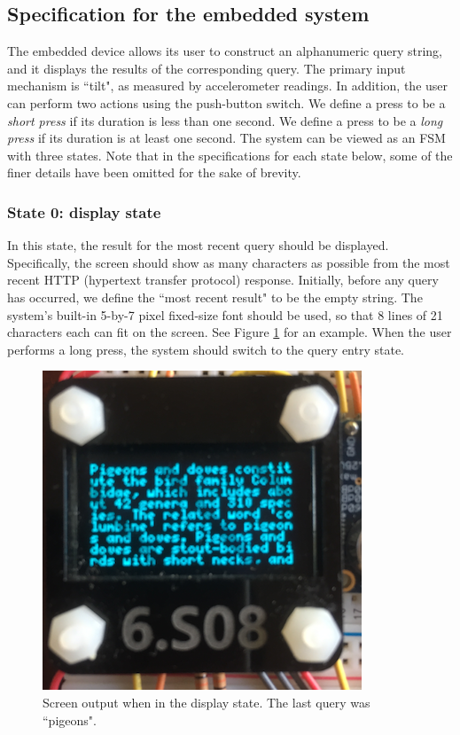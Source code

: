 \documentclass[12pt]{article}
\begin{document}
\subsection{Specification for the embedded system}
The embedded device allows its user to construct an alphanumeric query string, and it displays the results of the corresponding query.  The primary input mechanism is ``tilt", as measured by accelerometer readings.  In addition, the user can perform two actions using the push-button switch.  We define a press to be a \textit{short press} if its duration is less than one second.  We define a press to be a \textit{long press} if its duration is at least one second.  The system can be viewed as an FSM with three states.  Note that in the specifications for each state below, some of the finer details have been omitted for the sake of brevity.

\subsubsection{State 0: display state}
In this state, the result for the most recent query should be displayed.  Specifically, the screen should show as many characters as possible from the most recent HTTP (hypertext transfer protocol) response.  Initially, before any query has occurred, we define the ``most recent result" to be the empty string.  The system's built-in 5-by-7 pixel fixed-size font should be used, so that 8 lines of 21 characters each can fit on the screen.  See Figure \ref{fig:pigeons} for an example.  When the user performs a long press, the system should switch to the query entry state.

\begin{figure}[t]
\centering
\includegraphics[width=0.5\linewidth]{text-wiki-close.png}
\vspace{5mm}
\caption{Screen output when in the display state. The last query was ``pigeons".}
\label{fig:pigeons}
\end{figure}
\end{document}
